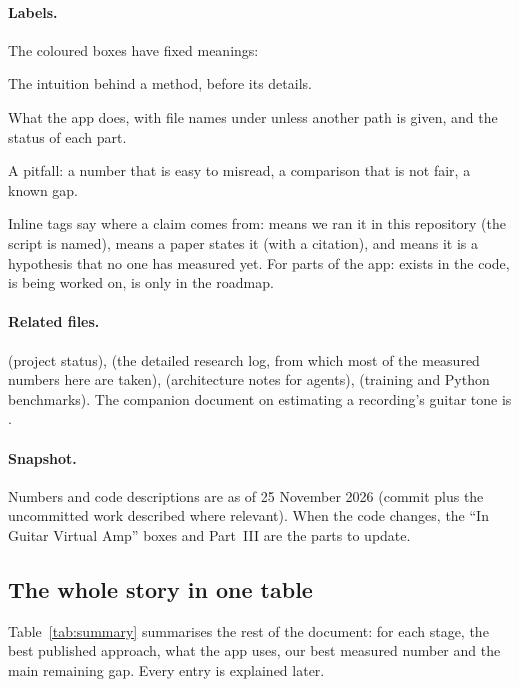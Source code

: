 \paragraph{Labels.} The coloured boxes have fixed meanings:
\begin{keyidea}[]
The intuition behind a method, before its details.
\end{keyidea}
\begin{inapp}[]
What the app does, with file names under  unless another
path is given, and the status of each part.
\end{inapp}
\begin{caution}[]
A pitfall: a number that is easy to misread, a comparison that is not fair, a
known gap.
\end{caution}
Inline tags say where a claim comes from: \measured{} means we ran it in this
repository (the script is named), \reported{} means a paper states it (with a
citation), and \expected{} means it is a hypothesis that no one has measured
yet. For parts of the app: \done{} exists in the code, \wip{} is being worked
on, \planned{} is only in the roadmap.

\paragraph{Related files.}  (project status),
 (the detailed research log, from which most
of the measured numbers here are taken),  (architecture notes for
agents),  (training and Python benchmarks). The
companion document on estimating a recording's guitar tone is
.

\paragraph{Snapshot.} Numbers and code descriptions are as of 25 November 2026
(commit  plus the uncommitted work described where relevant).
When the code changes, the ``In Guitar Virtual Amp'' boxes and Part~III are the
parts to update.

\subsection*{The whole story in one table}

Table~\ref{tab:summary} summarises the rest of the document: for each stage,
the best published approach, what the app uses, our best measured number and
the main remaining gap. Every entry is explained later.

